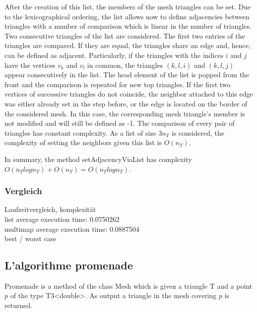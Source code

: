 \documentclass[10pt]{article}
\begin{document}
After the creation of this list, the members of the mesh triangles can be set. Due to the lexicographical ordering, the list allows now to define adjacencies between triangles with a number of comparison which is linear in the number of triangles. Two consecutive triangles of the list are considered. The first two entries of the triangles are compared. If they are equal, the triangles share an edge and, hence, can be defined as adjacent. Particularly, if the triangles with the indices $i$ and $j$ have the vertices $v_k$ and $v_l$ in common, the triangles $({k},{l},i)$ and $({k},{l},j)$ appear consecutively in the list. The head element of the list is popped from the front and the comparison is repeated for new top triangles. If the first two vertices of successive triangles do not coincide, the neighbor attached to this edge was either already set in the step before, or the edge is located on the border of the considered mesh. In this case, the corresponding mesh triangle's member is not modified and will still be defined as -1. The comparison of every pair of triangles has constant complexity. As a list of size $3 n_T$ is considered, the complexity of setting the neighbors given this list is $O(n_T)$.

In summary, the method {\ttfamily setAdjacencyViaList} has complexity $O(n_Tlogn_T) + O(n_T) = O(n_Tlogn_T)$.

\subsubsection{Vergleich}

Laufzeitvergleich, komplexität\\

list average execution time: 0.0750262\\
multimap average execution time: 0.0887504\\

best / worst case


\subsection{L'algorithme promenade} \label{promenade}

Promenade is a method of the class Mesh which is given a triangle {\ttfamily T} and a point $p$ of the type {\ttfamily T3<double>}. As output a triangle in the mesh covering $p$ is returned. 
\end{document}
